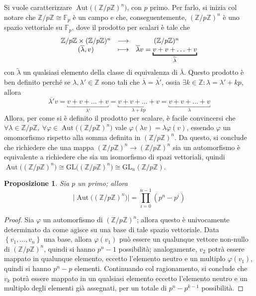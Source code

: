 \documentclass[11pt]{article}
\theoremstyle{style}
\newtheorem{prop}{Proposizione}[section]
\numberwithin{equation}{subsection}
\begin{document}
Si vuole caratterizzare $\operatorname{Aut} \big((\mathbb{Z}/p\mathbb{Z})^n\big)$, con $p$ primo.
Per farlo, si inizia col notare che $\mathbb{Z}/p\mathbb{Z} \cong \mathbb{F}_p$ \`e un campo e che, conseguentemente, $(\mathbb{Z}/p\mathbb{Z})^n$ \`e uno spazio vettoriale su $\mathbb{F}_p$, dove il prodotto per scalari \`e tale che
\[
\begin{array}
	{c c c} 
	\mathbb{Z}/p\mathbb{Z}\times (\mathbb{Z}/p\mathbb{Z})^n &\longrightarrow & (\mathbb{Z}/p\mathbb{Z})^n\\
	(\overline{\lambda },v) &\longmapsto & \overline{\lambda }v = \underbracket{v + v+ \ldots+v}_{\widetilde{\lambda }} 
\end{array}
\] 
con $\widetilde{\lambda }$ un qualsiasi elemento della classe di equivalenza di $\overline{\lambda }$.
Questo prodotto \`e ben definito perch\'e se $\lambda , \lambda ' \in \mathbb{Z}$ sono tali che $\overline{\lambda } = \overline{\lambda '}$, ossia $\exists k \in \mathbb{Z} : \lambda  = \lambda ' + kp$, allora
\[
\overline{\lambda '} v = \underbracket{v + v+ \ldots+v}_{\lambda '}= \underbracket{v + v+ \ldots+v}_{\lambda +kp} = \underbracket{v + v+ \ldots+v}_{\lambda}
\] 
Allora, per come si \`e definito il prodotto per scalare, \`e facile convincersi che $\forall \lambda \in \mathbb{Z}/p\mathbb{Z},\ \forall \varphi \in \operatorname{Aut} \big((\mathbb{Z}/p\mathbb{Z})^n\big)$ vale $\varphi (\lambda v) = \lambda \varphi (v)$, essendo $\varphi $ un omomorfismo rispetto alla somma definita in $(\mathbb{Z}/p\mathbb{Z})^n$. 
Da questo, si conclude che richiedere che una mappa $(\mathbb{Z}/p\mathbb{Z})^n \to (\mathbb{Z}/p\mathbb{Z})^n$ sia un automorfismo \`e equivalente a richiedere che sia un isomorfismo di spazi vettoriali, quindi $\operatorname{Aut} \big((\mathbb{Z}/p\mathbb{Z})^n\big) \cong \mathrm{GL} \big((\mathbb{Z}/p\mathbb{Z})^n\big)\cong \mathrm{GL} _n (\mathbb{Z}/p\mathbb{Z})$.
\begin{prop}
	Sia $p$ un primo; allora
	\[
	\big\lvert \operatorname{Aut} \big((\mathbb{Z}/p\mathbb{Z})^n\big) \big\rvert = \prod_{i=0} ^{n-1} (p^n- p^i)
	\] 
\end{prop}
	\begin{proof}
		Sia $\varphi $ un automorfismo di $(\mathbb{Z}/p\mathbb{Z})^n$; allora questo \`e univocamente determinato da come agisce su una base di tale spazio vettoriale. 
		Data $\left\{ v_1,\ldots,v_n \right\} $ una base, allora $\varphi (v_1)$ pu\`o essere un qualunque vettore non-nullo di $(\mathbb{Z}/p\mathbb{Z})^n$, quindi si hanno $p^n-1$ possibilit\`a; analogamente, $v_2$ potr\`a essere mappato in qualunque elemento, eccetto l'elemento neutro e un multiplo $\varphi (v_1)$, quindi si hanno $p^n-p $ elementi. 
		Continuando col ragionamento, si conclude che $v_k$ potr\`a essere mappato in un qualsiasi elemento eccetto l'elemento neutro e un multiplo degli elementi gi\`a assegnati, per un totale di $p^n - p^{k-1} $ possibilit\`a.
	\end{proof}
\end{document}
